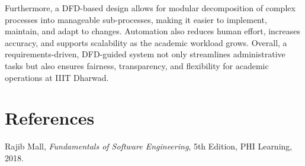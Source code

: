 \documentclass[12pt]{article}
\begin{document}
Furthermore, a DFD-based design allows for modular decomposition of complex processes into manageable sub-processes, making it easier to implement, maintain, and adapt to changes. Automation also reduces human effort, increases accuracy, and supports scalability as the academic workload grows. Overall, a requirements-driven, DFD-guided system not only streamlines administrative tasks but also ensures fairness, transparency, and flexibility for academic operations at IIIT Dharwad.

\section{References}
\begin{thebibliography}{9}

Rajib Mall, \textit{Fundamentals of Software Engineering}, 5th Edition, PHI Learning, 2018.

\end{thebibliography}
\end{document}
